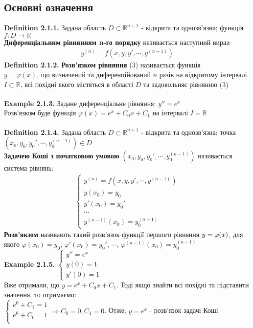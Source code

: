 \documentclass[a4paper, 14pt]{extarticle}
\def\defin#1{\textbf{Definition {#1}}}
\def\ex#1{\textbf{Example {#1}}}
\def\bigline{\vspace{5mm}\\}
\begin{document}
	\subsection{Основні означення}
	\defin{2.1.1.} Задана область $D \subset \mathbb{R}^{n+1}$ - відкрита та однозв'язна; функція $f: D \rightarrow \mathbb{R}$\\
	\textbf{Диференціальним рівнянням n-го порядку} називається наступний вираз:
	\begin{align}
	y^{(n)} = f(x,y,y',\cdots,y^{(n-1)})
	\end{align}
	\defin{2.1.2.} \textbf{Розв'язком рівняння} (3) називається функція \\ $y= \varphi(x)$, що визначений та диференційований $n$ разів на відкритому інтервалі $I \subset \mathbb{R}$, всі похідні якого містяться в області $D$ та задовольняє рівнянню (3)\\
	\bigline
	\ex{2.1.3.} Задане диференціальне рівняння: $y'' = e^x$\\
	Розв'язком буде функція $\varphi(x) = e^x + C_0x + C_1$ на інтервалі $I = \mathbb{R}$\\
	\bigline
	\defin{2.1.4.} Задана область $D \subset \mathbb{R}^{n+1}$ - відкрита та однозв'язна; точка $(x_0, y_0, y_0', \cdots, y_0^{(n-1)}) \in D$\\
	\textbf{Задачею Коші з початковою умовою} $(x_0, y_0, y_0', \cdots, y_0^{(n-1)})$ називається система рівнянь:
	\begin{align*}
	\begin{cases}
	\displaystyle y^{(n)} = f(x,y,y',\cdots,y^{(n-1)})\\
	y(x_0)=y_0\\
	y'(x_0) = y_0'\\
	\cdots\\
	y^{(n-1)}(x_0) = y_0^{(n-1)}
	\end{cases}
	\end{align*}
	\textbf{Розв'якзом} називають такий розв'язок функції першого рівняння $\\y=\varphi(x)$, для якого $\varphi(x_0)=y_0$, $\varphi'(x_0)=y_0'$, $\cdots$, $\varphi^{(n-1)}(x_0)=y_0^{(n-1)}$
	\bigline
	\ex{2.1.5.} 	$\begin{cases}
	y'' = e^x\\
	y(0) = 1\\
	y'(0) = 1
	\end{cases}$\\
	Вже отримали, що $y = e^x + C_0 x + C_1$. Тоді якщо знайти всі похідні та підставити значення, то отримаємо:\\
	$\begin{cases}
	e^0 + C_1 = 1\\
	e^0 + C_0 = 1\\
	\end{cases} \Rightarrow C_0 = 0, C_1 = 0
	$. Отже, $y=e^x$ - розв'язок задачі Коші
\end{document}
